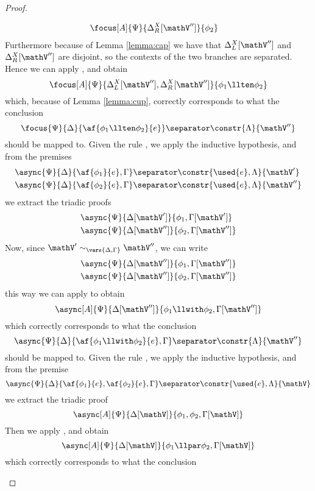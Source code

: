 \begin{proof}
\begin{itemize}
\begin{align*}
				&\focus[A]{\Psi}{\Delta_R^X[\mathV'']}{\phi_2} 
			\end{align*}
			Furthermore because of Lemma \ref{lemma:cap} we have that $\Delta_L^X[\mathV'']$ and $\Delta_R^X[\mathV'']$ are disjoint, so the contexts of the two branches are separated.
			Hence we can apply \derRule[A]{\displayten}, and obtain
			$$ \focus[A]{\Psi}{\Delta_L^X[\mathV''], \Delta_R^X[\mathV'']}{\phi_1 \llten \phi_2} $$
			which, because of Lemma \ref{lemma:cup}, correctly corresponds to what the conclusion
			$$ \focus{\Psi}{\Delta}{\af{\phi_1 \llten \phi_2}{e}} \separator \constr{\Lambda}{\mathV''} $$
			should be mapped to.
		\indCase{\displaywith} Given the rule \derRule{\displaywith}, we apply the inductive hypothesis, and from the premises
			\begin{align*}
				&\async{\Psi}{\Delta}{\af{\phi_1}{e}, \Gamma} \separator \constr{\used{e}, \Lambda}{\mathV'} \\
				&\async{\Psi}{\Delta}{\af{\phi_2}{e}, \Gamma} \separator \constr{\used{e}, \Lambda}{\mathV''} 
			\end{align*}
			we extract the triadic proofs
			\begin{align*}
			 	&\async{\Psi}{\Delta[\mathV']}{\phi_1, \Gamma[\mathV']}\\
			 	&\async{\Psi}{\Delta[\mathV'']}{\phi_2, \Gamma[\mathV'']} 
			\end{align*}
			Now, since $\mathV' \sim_{\vars{\Delta, \Gamma}} \mathV''$, we can write
			\begin{align*}
				&\async{\Psi}{\Delta[\mathV'']}{\phi_1, \Gamma[\mathV'']} \\
				&\async{\Psi}{\Delta[\mathV'']}{\phi_2, \Gamma[\mathV'']} 
			\end{align*}
			this way we can apply \derRule[A]{\displaywith} to obtain
			$$ \async[A]{\Psi}{\Delta[\mathV'']}{\phi_1 \llwith \phi_2, \Gamma[\mathV'']} $$
			which correctly corresponds to what the conclusion
			$$ \async{\Psi}{\Delta}{\af{\phi_1 \llwith \phi_2}{e}, \Gamma} \separator \constr{\Lambda}{\mathV''} $$
			should be mapped to.
		\indCase{\displaypar} Given the rule \derRule{\displaypar}, we apply the inductive hypothesis, and from the premise
			$$ \async{\Psi}{\Delta}{\af{\phi_1}{e}, \af{\phi_2}{e}, \Gamma} \separator \constr{\used{e}, \Lambda}{\mathV}$$
			we extract the triadic proof 
			$$\async[A]{\Psi}{\Delta[\mathV]}{\phi_1, \phi_2, \Gamma[\mathV]} $$
			Then we apply \derRule[A]{\displaypar}, and obtain
			$$\async[A]{\Psi}{\Delta[\mathV]}{\phi_1 \llpar \phi_2, \Gamma[\mathV]} $$
			which correctly corresponds to what the conclusion

\end{itemize}
\end{proof}
